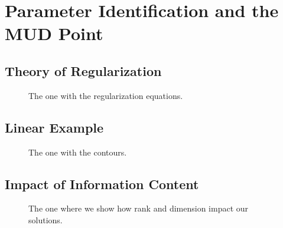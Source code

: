 \section{Parameter Identification and the MUD Point}

\subsection{Theory of Regularization}


\begin{frame}[t]
\centering
\begin{figure}
\centering

The one with the regularization equations.

\end{figure}

\end{frame}


\subsection{Linear Example}


\begin{frame}[t]
\centering
\begin{figure}
\centering

The one with the contours.

\end{figure}

\end{frame}



\subsection{Impact of Information Content}


\begin{frame}[t]
\centering
\begin{figure}
\centering

The one where we show how rank and dimension impact our solutions.

\end{figure}

\end{frame}

